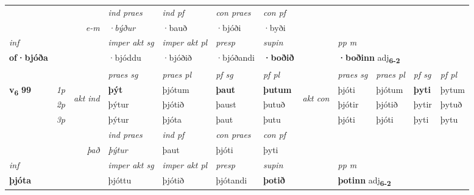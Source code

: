 \begin{longtable}[l]{X>{\footnotesize\itshape}llXXXXlXXXX}
   && &  \textit{ind praes} & \textit{ind pf} & \textit{con praes} & \textit{con pf} \\*
\multicolumn{3}{r}{\textit{e-m}} & ·býður & ·bauð & ·bjóði & ·byði \\*

\cmidrule{4-7}
   {\textit{inf}} & &  & \textit{imper akt sg} & \textit{imper akt pl}   & \textit{presp} & \textit{supin}  && \textit{pp m} \\*
  {\textbf{of\allowbreak ·bjóða}} & && ·bjóddu  & ·bjóðið   & ·bjóðandi &  \textbf{·boðið}  && \multicolumn{2}{l}{\textbf{·boðinn} adj\textbf{\textsubscript{6-2}}} \\*

\midrule

 & &   & \textit{praes sg}  & \textit{praes pl}    & \textit{ pf sg} & \textit{pf pl} & & \textit{praes sg}  & \textit{praes pl}    & \textit{pf sg} & \textit{pf pl }  \\ \cmidrule{4-7} \cmidrule{9-12}
 \multirow{2}{*}{{{\textbf{v{\textsubscript{6}}} \Large{\textbf{99}}}}}  & 1p & \multirow{3}{*}{\begin{turn}{90}\textit{akt ind}\end{turn}} & \textbf{þýt} & þjótum & \textbf{þaut} & \textbf{þutum} & \multirow{3}{*}{\begin{turn}{90}\textit{akt con}\end{turn}} &þjóti & þjótum & \textbf{þyti} & þytum\\*
 & 2p &  &  þýtur  & þjótið & þaust & þutuð & & þjótir & þjótið & þytir & þytuð \\*
 & 3p &  & þýtur & þjóta & þaut & þutu & & þjóti & þjóti& þyti & þytu \\*
\cmidrule{4-7} \cmidrule{9-12}

   && &  \textit{ind praes} & \textit{ind pf} & \textit{con praes} & \textit{con pf} \\*
\multicolumn{3}{r}{\textit{það}} & þýtur & þaut & þjóti & þyti \\*

\cmidrule{4-7}
   {\textit{inf}} & &  & \textit{imper akt sg} & \textit{imper akt pl}   & \textit{presp} & \textit{supin}  && \textit{pp m} \\*
  {\textbf{þjóta}} & && þjóttu  & þjótið   & þjótandi &  \textbf{þotið}  && \multicolumn{2}{l}{\textbf{þotinn} adj\textbf{\textsubscript{6-2}}} \\*

\midrule


\end{longtable}
